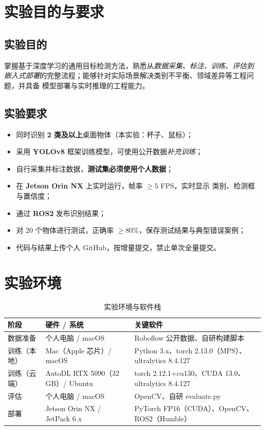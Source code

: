 \documentclass[UTF8,a4paper,zihao=-4]{ctexart}
\begin{document}
\section{实验目的与要求}
\subsection{实验目的}
\par 掌握基于深度学习的通用目标检测方法，熟悉从\emph{数据采集、标注、训练、评估到
嵌入式部署}的完整流程；能够针对实际场景解决类别不平衡、领域差异等工程问题，并具备
模型部署与实时推理的工程能力。

\subsection{实验要求}
\begin{itemize}
  \item 同时识别 \textbf{2 类及以上}桌面物体（本实验：杯子、鼠标）；
  \item 采用 \textbf{YOLOv8} 框架训练模型，可使用公开数据\emph{补充训练}；
  \item 自行采集并标注数据，\textbf{测试集必须使用个人数据}；
  \item 在 \textbf{Jetson Orin NX} 上实时运行，帧率 $\geq 5$ FPS，实时显示
        类别、检测框与置信度；
  \item 通过 \textbf{ROS2} 发布识别结果；
  \item 对 20 个物体进行测试，正确率 $\geq 80\%$，保存测试结果与典型错误案例；
  \item 代码与结果上传个人 GitHub，按增量提交，禁止单次全量提交。
\end{itemize}

\section{实验环境}
\begin{table}[htbp]
  \centering
  \caption{实验环境与软件栈}
  \begin{tabular}{p{2.2cm} p{3.8cm} p{7.6cm}}
    \toprule
    阶段 & 硬件 / 系统 & 关键软件 \\
    \midrule
    数据准备 & 个人电脑 / macOS & Roboflow 公开数据、自研构建脚本 \\
    训练（本地） & Mac（Apple 芯片）/ macOS & Python 3.x、torch 2.13.0（MPS）、
      ultralytics 8.4.127 \\
    训练（云端） & AutoDL RTX 5090（32 GB）/ Ubuntu & torch 2.12.1+cu130、CUDA 13.0、
      ultralytics 8.4.127 \\
    评估 & 个人电脑 / macOS & OpenCV、自研 evaluate.py \\
    部署 & Jetson Orin NX / JetPack 6.x & PyTorch FP16（CUDA）、OpenCV、
      ROS2（Humble） \\
    \bottomrule
  \end{tabular}
\end{table}
\end{document}
